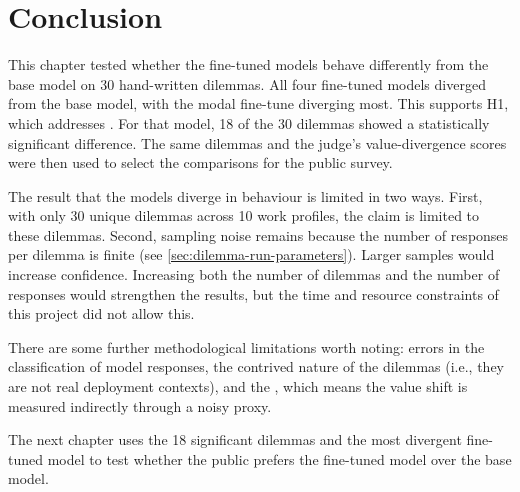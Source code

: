 \section{Conclusion}

This chapter tested whether the fine-tuned models behave differently from the base model on 30 hand-written dilemmas. All four fine-tuned models diverged from the base model, with the modal fine-tune diverging most. This supports H1, which addresses . For that model, 18 of the 30 dilemmas showed a statistically significant difference. The same dilemmas and the judge's value-divergence scores were then used to select the comparisons for the public survey.

The result that the models diverge in behaviour is limited in two ways. First, with only 30 unique dilemmas across 10 work profiles, the claim is limited to these dilemmas. Second, sampling noise remains because the number of responses per dilemma is finite (see \ref{sec:dilemma-run-parameters}). Larger samples would increase confidence. Increasing both the number of dilemmas and the number of responses would strengthen the results, but the time and resource constraints of this project did not allow this.

There are some further methodological limitations worth noting: errors in the classification of model responses, the contrived nature of the dilemmas (i.e., they are not real deployment contexts), and the , which means the value shift is measured indirectly through a noisy proxy.

The next chapter uses the 18 significant dilemmas and the most divergent fine-tuned model to test whether the public prefers the fine-tuned model over the base model.